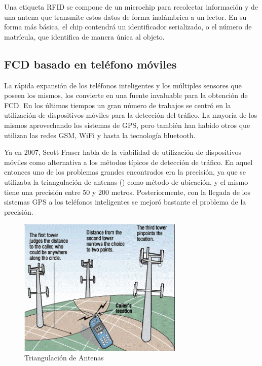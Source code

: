 Una etiqueta RFID se compone de un microchip para recolectar información y de una antena que transmite estos datos de forma inalámbrica a un lector. En su forma más básica, el chip contendrá un identificador serializado, o el número de matrícula, que identifica de manera única al objeto.

\subsection{FCD basado en teléfono móviles}

La rápida expansión de los teléfonos inteligentes y los múltiples sensores que poseen los mismos, los convierte en una fuente invaluable para la obtención de FCD. En los últimos tiempos un gran número de trabajos se centró en la utilización de dispositivos móviles para la detección del tráfico. La mayoría de los mismos aprovechando los sistemas de GPS, pero también han habido otros que utilizan las redes GSM, WiFi y hasta la tecnología bluetooth.

Ya en 2007, Scott Fraser \cite{fraser2007use} habla de la viabilidad de utilización de dispositivos móviles como alternativa a los métodos típicos de detección de tráfico. En aquel entonces uno de los problemas grandes encontrados era la precisión, ya que se utilizaba la triangulación de antenas () como método de ubicación, y el mismo tiene una precisión entre 50 y 200 metros. Posteriormente, con la llegada de los sistemas GPS a los teléfonos inteligentes se mejoró bastante el problema de la precisión.

\begin{figure}[h]
	\centering
	\includegraphics[width=0.7\textwidth]{capitulos/3/figuras/figura5.jpg}
	\caption{\label{fig:triangulacionAntenas} Triangulación de Antenas}	
\end{figure}

